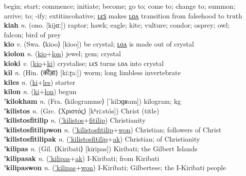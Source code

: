 begin; start; commence; initiate; become; go to; come to; change to; summon; arrive; to; -ify; 	extit{incohative}; \hyperref[kiles]{ʟєꜱ} makes \hyperref[kilon]{ʟᴏᴧ} transition from falsehood to truth \label{ki} \\
\textbf{kiah} \textit{n.} (ono. [kijɑː])
raptor; hawk; eagle; kite; vulture; condor; osprey; owl; falcon; bird of prey \label{kiah} \\
\textbf{kio} \textit{v.} (Swa. ⟨kioo⟩ [kioo])
be crystal; \hyperref[kiolon]{ʟᴏᴧ} is made out of crystal \label{kio} \\
\textbf{kiolon} \textit{n.} (\hyperref[kio]{kio}+\hyperref[lon]{lon})
jewel; gem; crystal \label{kiolon} \\
\textbf{kioki} \textit{v.} (\hyperref[kio]{kio}+\hyperref[ki]{ki})
crystalise; ʟєꜱ turns ʟᴏᴧ into crystal \label{kioki} \\
\textbf{kil} \textit{n.} (Hin. ⟨कीड़ा⟩ [kiːɽaː])
worm; long limbless invertebrate \label{kil} \\
\textbf{kiles} \textit{n.} (\hyperref[ki]{ki}+\hyperref[les]{les})
starter \label{kiles} \\
\textbf{kilon} \textit{n.} (\hyperref[ki]{ki}+\hyperref[lon]{lon})
begun \label{kilon} \\
\textbf{'kilokham} \textit{n.} (Fra. ⟨kilogramme⟩ [ˈkilɔɡʁam])
kilogram; kg \label{'kilokham} \\
\textbf{'kilistos} \textit{n.} (Grc. ⟨Χριστός⟩ [kʰriːstós])
Christ (title) \label{'kilistos} \\
\textbf{'kilistosfitilip} \textit{n.} (\hyperref['kilistos]{'kilistos}+\hyperref[fitilip]{fitilip})
Christianity \label{'kilistosfitilip} \\
\textbf{'kilistosfitilipwon} \textit{n.} (\hyperref['kilistosfitilip]{'kilistosfitilip}+\hyperref[won]{won})
Christian; followers of Christ \label{'kilistosfitilipwon} \\
\textbf{'kilistosfitilipak} \textit{n.} (\hyperref['kilistosfitilip]{'kilistosfitilip}+\hyperref[ak]{ak})
Christian; of Christianity \label{'kilistosfitilipak} \\
\textbf{'kilipas} \textit{n.} (Gil. ⟨Kiribati⟩ [kiɾipas])
Kiribati; the Gilbert Islands \label{'kilipas} \\
\textbf{'kilipasak} \textit{n.} (\hyperref['kilipas]{'kilipas}+\hyperref[ak]{ak})
I-Kiribati; from Kiribati \label{'kilipasak} \\
\textbf{'kilipaswon} \textit{n.} (\hyperref['kilipas]{'kilipas}+\hyperref[won]{won})
I-Kiribati; Gilbertese; the I-Kiribati people \label{'kilipaswon} \\
